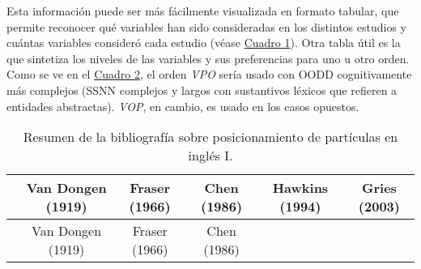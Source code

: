 \documentclass[12pt,spanish,a4paper,]{article}
\begin{document}
Esta información puede ser más fácilmente visualizada en formato
tabular, que permite reconocer qué variables han sido consideradas en
los distintos estudios y cuántas variables consideró cada estudio (véase
\protect\hyperlink{cuadro1}{Cuadro 1}). Otra tabla útil es la que
sintetiza los niveles de las variables y sus preferencias para uno u
otro orden. Como se ve en el \protect\hyperlink{cuadro2}{Cuadro 2}, el
orden \emph{VPO} sería usado con OODD cognitivamente más complejos (SSNN
complejos y largos con sustantivos léxicos que refieren a entidades
abstractas). \emph{VOP}, en cambio, es usado en los casos opuestos.

\begin{longtable}[]{@{}lccccc@{}}
\caption{\protect\hypertarget{cuadro1}{}{Resumen} de la bibliografía
sobre posicionamiento de partículas en inglés I.}\tabularnewline
\toprule
\begin{minipage}[b]{0.18\columnwidth}\raggedright
\strut
\end{minipage} & \begin{minipage}[b]{0.15\columnwidth}\centering
Van Dongen (1919)\strut
\end{minipage} & \begin{minipage}[b]{0.13\columnwidth}\centering
Fraser (1966)\strut
\end{minipage} & \begin{minipage}[b]{0.13\columnwidth}\centering
Chen (1986)\strut
\end{minipage} & \begin{minipage}[b]{0.13\columnwidth}\centering
Hawkins (1994)\strut
\end{minipage} & \begin{minipage}[b]{0.13\columnwidth}\centering
Gries (2003)\strut
\end{minipage}\tabularnewline
\midrule
\endfirsthead
\toprule
\begin{minipage}[b]{0.18\columnwidth}\raggedright
\strut
\end{minipage} & \begin{minipage}[b]{0.15\columnwidth}\centering
Van Dongen (1919)\strut
\end{minipage} & \begin{minipage}[b]{0.13\columnwidth}\centering
Fraser (1966)\strut
\end{minipage} & \begin{minipage}[b]{0.13\columnwidth}\centering
Chen (1986)\strut
\end{minipage} & \begin{minipage}[b]{0.13\columnwidth}\centering

\end{minipage}
\end{longtable}
\end{document}
